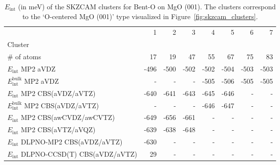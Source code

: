 \begin{table}
\caption{\label{tab:system_eint_mgo_no_bent-o}$E_\textrm{int}$ (in meV) of the SKZCAM clusters for Bent-O  on MgO (001). The clusters correspond to the `O-centered MgO (001)' type visualized in Figure~\ref{fig:skzcam_clusters}.}
\begin{adjustbox}{center,max width=1.4\textwidth}
\begin{tabular}{lrrrrrrr}
\toprule
 & 1 & 2 & 3 & 4 & 5 & 6 & 7 \\ 
Cluster &  &  &  &  &  &  &  \\
\midrule
\# of atoms & 17 & 19 & 47 & 55 & 67 & 75 & 83 \\
$E_\textrm{int}$ MP2 aVDZ & -496 & -500 & -502 & -502 & -504 & -503 & -503 \\
$E_\textrm{int}^\textrm{bulk}$ MP2 aVDZ & - & - & - & -505 & -506 & -505 & -505 \\
$E_\textrm{int}$ MP2 CBS(aVDZ/aVTZ) & -640 & -641 & -643 & -645 & -646 & - & - \\
$E_\textrm{int}^\textrm{bulk}$ MP2 CBS(aVDZ/aVTZ) & - & - & - & -646 & -647 & - & - \\
$E_\textrm{int}$ MP2 CBS(awCVDZ/awCVTZ) & -649 & -656 & -661 & - & - & - & - \\
$E_\textrm{int}$ MP2 CBS(aVTZ/aVQZ) & -639 & -638 & -648 & - & - & - & - \\
$E_\textrm{int}$ DLPNO-MP2 CBS(aVDZ/aVTZ) & -630 & - & - & - & - & - & - \\
$E_\textrm{int}$ DLPNO-CCSD(T) CBS(aVDZ/aVTZ) & 29 & - & - & - & - & - & - \\
\bottomrule
\end{tabular}
\end{adjustbox}
\end{table}

